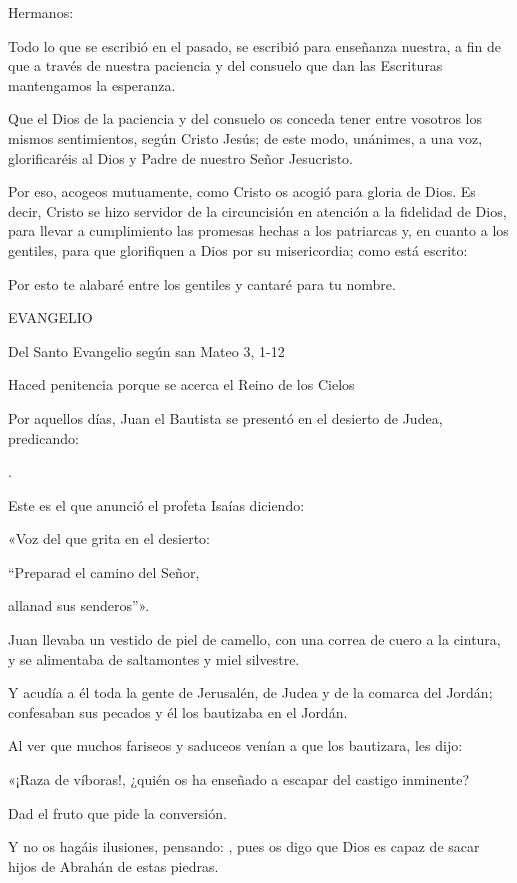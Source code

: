 \begin{body}
Hermanos:

Todo lo que se escribió en el pasado, se escribió para enseñanza
nuestra, a fin de que a través de nuestra paciencia y del consuelo que
dan las Escrituras mantengamos la esperanza.

Que el Dios de la paciencia y del consuelo os conceda tener entre
vosotros los mismos sentimientos, según Cristo Jesús; de este modo,
unánimes, a una voz, glorificaréis al Dios y Padre de nuestro Señor
Jesucristo.

Por eso, acogeos mutuamente, como Cristo os acogió para gloria de Dios.
Es decir, Cristo se hizo servidor de la circuncisión en atención a la
fidelidad de Dios, para llevar a cumplimiento las promesas hechas a los
patriarcas y, en cuanto a los gentiles, para que glorifiquen a Dios por
su misericordia; como está escrito:

Por esto te alabaré entre los gentiles y cantaré para tu nombre.

EVANGELIO

Del Santo Evangelio según san Mateo 3, 1-12

Haced penitencia porque se acerca el Reino de los Cielos

Por aquellos días, Juan el Bautista se presentó en el desierto de Judea,
predicando:

.

Este es el que anunció el profeta Isaías diciendo:

«Voz del que grita en el desierto:

``Preparad el camino del Señor,

allanad sus senderos''».

Juan llevaba un vestido de piel de camello, con una correa de cuero a la
cintura, y se alimentaba de saltamontes y miel silvestre.

Y acudía a él toda la gente de Jerusalén, de Judea y de la comarca del
Jordán; confesaban sus pecados y él los bautizaba en el Jordán.

Al ver que muchos fariseos y saduceos venían a que los bautizara, les
dijo:

«¡Raza de víboras!, ¿quién os ha enseñado a escapar del castigo
inminente?

Dad el fruto que pide la conversión.

Y no os hagáis ilusiones, pensando: ,
pues os digo que Dios es capaz de sacar hijos de Abrahán de estas
piedras.


\end{body}
